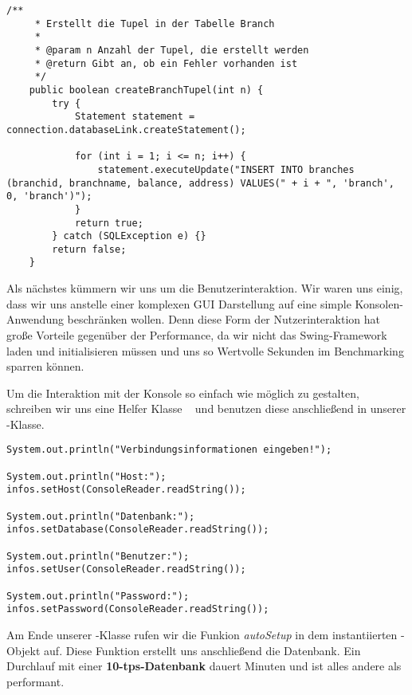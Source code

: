 \begin{lstlisting}[caption={Eine der drei Tupel Funktionen}]
	/**
	 * Erstellt die Tupel in der Tabelle Branch
	 * 
	 * @param n Anzahl der Tupel, die erstellt werden
	 * @return Gibt an, ob ein Fehler vorhanden ist
	 */
	public boolean createBranchTupel(int n) {
		try {
			Statement statement = connection.databaseLink.createStatement();

			for (int i = 1; i <= n; i++) {
				statement.executeUpdate("INSERT INTO branches (branchid, branchname, balance, address) VALUES(" + i + ", 'branch', 0, 'branch')");
			}
			return true;
		} catch (SQLException e) {}		
		return false;
	}
\end{lstlisting}

Als nächstes kümmern wir uns um die Benutzerinteraktion. Wir waren uns
einig, dass wir uns anstelle einer komplexen GUI Darstellung auf eine simple
Konsolen-Anwendung beschränken wollen. Denn diese Form der
Nutzerinteraktion hat große Vorteile gegenüber der Performance, da wir nicht
das Swing-Framework laden und initialisieren müssen und uns so Wertvolle
Sekunden im Benchmarking sparren können.

Um die Interaktion mit der Konsole so einfach wie möglich zu gestalten,
schreiben wir uns eine Helfer Klasse ~ und benutzen diese
anschließend in unserer -Klasse.

\begin{lstlisting}[caption={Verbindungsinformationen per Konsole}]
System.out.println("Verbindungsinformationen eingeben!");
			
System.out.println("Host:");
infos.setHost(ConsoleReader.readString());

System.out.println("Datenbank:");
infos.setDatabase(ConsoleReader.readString());

System.out.println("Benutzer:");
infos.setUser(ConsoleReader.readString());

System.out.println("Password:");
infos.setPassword(ConsoleReader.readString());
\end{lstlisting}

Am Ende unserer -Klasse rufen wir die Funkion
\textit{autoSetup} in dem instantiierten -Objekt auf. Diese Funktion erstellt uns
anschließend die Datenbank. Ein Durchlauf mit einer \textbf{10-tps-Datenbank}
dauert  Minuten und ist alles andere als performant.
\clearpage
